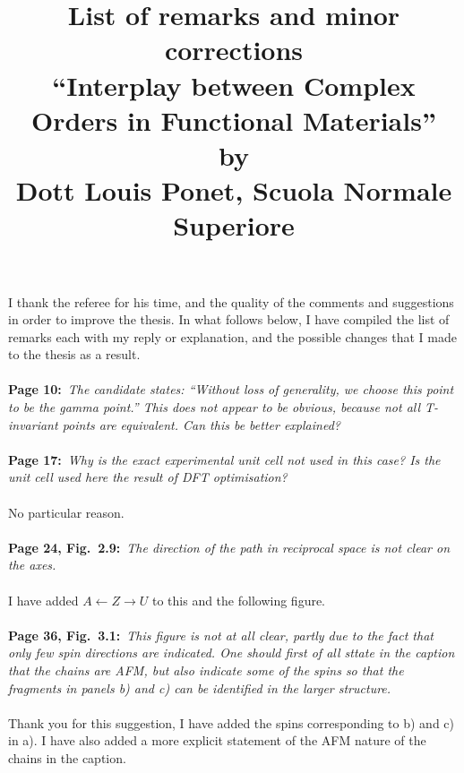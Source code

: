 \documentclass[a4, UTF8]{article}
\begin{document}
\title{List of remarks and minor corrections\\
\large ``Interplay between Complex Orders in Functional Materials''\\
by\\
Dott Louis Ponet, Scuola Normale Superiore}
\date{}
\maketitle
I thank the referee for his time, and the quality of the comments and suggestions in order to improve the thesis.
In what follows below, I have compiled the list of remarks each with my reply or explanation, and the possible changes that I made to the thesis as a result.
\\\\
{\bf Page 10:}~{\it The candidate states: ``Without loss of generality, we choose this point to be the gamma point.'' This does not appear to be obvious, because not all T-invariant points are equivalent. Can this be better explained?}
\\\\
{\bf Page 17:}~{\it Why is the exact experimental unit cell not used in this case? Is the unit cell used here the result of \gls{DFT} optimisation?}
\\\\
No particular reason.
\\\\
{\bf Page 24, Fig.~2.9:}~{\it The direction of the path in reciprocal space is not clear on the axes.}
\\\\
I have added $A \leftarrow Z \rightarrow U$ to this and the following figure.
\\\\
{\bf Page 36, Fig.~3.1:}~{\it This figure is not at all clear, partly due to the fact that only few spin directions are indicated. One should first of all sttate in the caption that the chains are \gls{AFM}, but also indicate some of the spins so that the fragments in panels b) and c) can be identified in the larger structure.}
\\\\
Thank you for this suggestion, I have added the spins corresponding to b) and c) in a).
I have also added a more explicit statement of the AFM nature of the chains in the caption.
\end{document}

